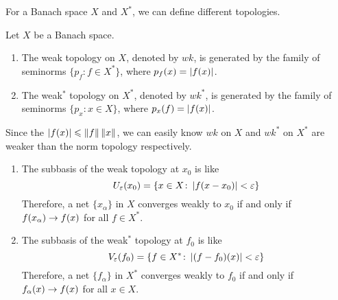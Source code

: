 \documentclass[a4paper,11pt]{report}
\begin{document}
For a Banach space $X$ and $X^{*}$, we can define different topologies.

\begin{defn}
	Let $X$ be a Banach space.
	\begin{enumerate}[label=\arabic*)]
		\item The weak topology on $X$, denoted by $wk$, is generated by the family of seminorms $\{p_f \colon f \in X^{*}\}$, where $p_f(x) = \left\lvert f(x)\right\lvert$.
		\item The weak$^{*}$ topology on $X^{*}$, denoted by $wk^{*}$, is generated by the family of seminorms $\{p_x \colon x \in X\}$, where $p_x(f) = \left\lvert f(x)\right\lvert$.
	\end{enumerate}
\end{defn}
\begin{rem}
	Since the $\left\lvert f(x)\right\lvert \leqslant \left\lVert f\right\lVert\left\lVert x\right\lVert$, we can easily know $wk$ on $X$ and $wk^{*}$ on $X^{*}$ are weaker than the norm topology respectively. 
	\begin{enumerate}[label=\arabic*)]
		\item The subbasis of the weak topology at $x_0$ is like 
			\begin{equation*}
				U_\varepsilon(x_0) = \{x \in X \colon \left\lvert f(x-x_0)\right\lvert < \varepsilon\}
			\end{equation*}
		Therefore, a net $\{x_\alpha\}$ in $X$ converges weakly to $x_0$ if and only if $f(x_\alpha) \rightarrow f(x)$ for all $f \in X^{*}$.
		\item The subbasis of the weak$^{*}$ topology at $f_0$ is like
			\begin{equation*}
				V_\varepsilon(f_0) = \{f \in X^{*} \colon \left\lvert(f-f_0)(x)\right\lvert < \varepsilon\}
			\end{equation*}
		Therefore, a net $\{f_\alpha\}$ in $X^{*}$ converges weakly to $f_0$ if and only if $f_\alpha(x) \rightarrow f(x)$ for all $x \in X$.
	\end{enumerate}
\end{rem}
\end{document}

